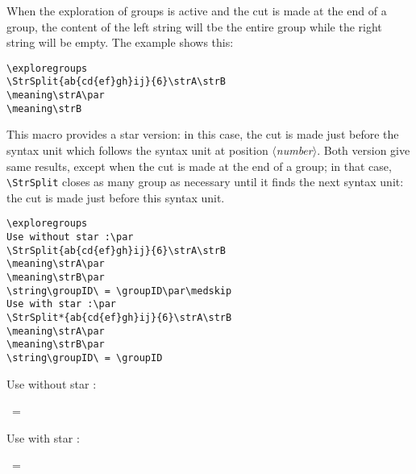 \documentclass[a4paper,10pt]{article}
\newcommand\argu[1]{$\langle$\textit{#1}$\rangle$}
\newcommand\US{syntax unit\xspace}
\newcommand\styleexercice{\footnotesize}
\newcommand\verbinline{\lstinline[basicstyle=\normalsize\ttfamily]}
\begin{document}
When the exploration of groups is active and the cut is made at the end of a group, the content of the left string will tbe the entire group while the right string will be empty. The example shows this:\par\nobreak\smallskip
\begin{minipage}[c]{0.65\linewidth}
\hfill
\begin{lstlisting}
\exploregroups
\StrSplit{ab{cd{ef}gh}ij}{6}\strA\strB
\meaning\strA\par
\meaning\strB
\end{lstlisting}%
\end{minipage}\hfill
\begin{minipage}[c]{0.35\linewidth}
	\styleexercice
	\exploregroups
	\strA\strB
	\meaning\strA\par
	\meaning\strB
\end{minipage}%
\medskip

This macro provides a star version: in this case, the cut is made just before the \US which follows the \US at position \argu{number}. Both version give same results, except when the cut is made at the end of a group; in that case, \verbinline|\StrSplit| closes as many group as necessary until it finds the next \US: the cut is made just before this \US.\smallskip

\begin{minipage}[c]{0.65\linewidth}
\hfill
\begin{lstlisting}
\exploregroups
Use without star :\par
\StrSplit{ab{cd{ef}gh}ij}{6}\strA\strB
\meaning\strA\par
\meaning\strB\par
\string\groupID\ = \groupID\par\medskip
Use with star :\par
\StrSplit*{ab{cd{ef}gh}ij}{6}\strA\strB
\meaning\strA\par
\meaning\strB\par
\string\groupID\ = \groupID
\end{lstlisting}%
\end{minipage}\hfill
\begin{minipage}[c]{0.35\linewidth}
	\styleexercice
	\exploregroups
	Use without star :\par
	\strA\strB
	\meaning\strA\par
	\meaning\strB\par
	\string\groupID\ = \groupID\par\medskip
	Use with star :\par
	\strA\strB
	\meaning\strA\par
	\meaning\strB\par
	\string\groupID\ = \groupID
\end{minipage}%
\end{document}
